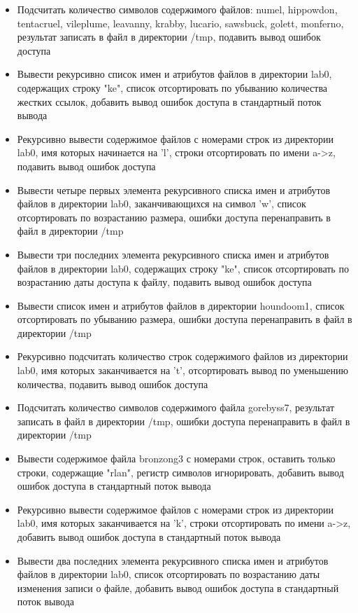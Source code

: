 \documentclass{article}
\begin{document}
\begin{itemize}
  \item Подсчитать количество символов содержимого файлов: numel, hippowdon, tentacruel, vileplume, leavanny, krabby, lucario, sawsbuck, golett, monferno, результат записать в файл в директории /tmp, подавить вывод ошибок доступа
  \item Вывести рекурсивно список имен и атрибутов файлов в директории lab0, содержащих строку "ke", список отсортировать по убыванию количества жестких ссылок, добавить вывод ошибок доступа в стандартный поток вывода
  \item Рекурсивно вывести содержимое файлов с номерами строк из директории lab0, имя которых начинается на 'l', строки отсортировать по имени a->z, подавить вывод ошибок доступа
  \item Вывести четыре первых элемента рекурсивного списка имен и атрибутов файлов в директории lab0, заканчивающихся на символ 'w', список отсортировать по возрастанию размера, ошибки доступа перенаправить в файл в директории /tmp
  \item Вывести три последних элемента рекурсивного списка имен и атрибутов файлов в директории lab0, содержащих строку "ke", список отсортировать по возрастанию даты доступа к файлу, подавить вывод ошибок доступа
  \item Вывести список имен и атрибутов файлов в директории houndoom1, список отсортировать по убыванию размера, ошибки доступа перенаправить в файл в директории /tmp
  \item Рекурсивно подсчитать количество строк содержимого файлов из директории lab0, имя которых заканчивается на 't', отсортировать вывод по уменьшению количества, подавить вывод ошибок доступа
  \item Подсчитать количество символов содержимого файла gorebyss7, результат записать в файл в директории /tmp, ошибки доступа перенаправить в файл в директории /tmp
  \item Вывести содержимое файла bronzong3 с номерами строк, оставить только строки, содержащие "rlan", регистр символов игнорировать, добавить вывод ошибок доступа в стандартный поток вывода
  \item Рекурсивно вывести содержимое файлов с номерами строк из директории lab0, имя которых заканчивается на 'k', строки отсортировать по имени a->z, добавить вывод ошибок доступа в стандартный поток вывода
  \item Вывести два последних элемента рекурсивного списка имен и атрибутов файлов в директории lab0, список отсортировать по возрастанию даты изменения записи о файле, добавить вывод ошибок доступа в стандартный поток вывода

\end{itemize}
\end{document}
